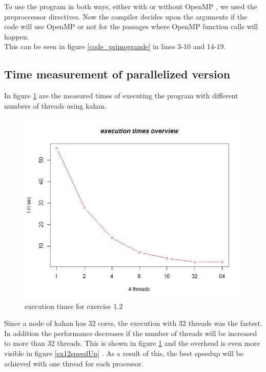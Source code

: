 \documentclass[11pt,a4paper]{article}
\begin{document}
To use the program in both ways, either with or without OpenMP , we used the preproccessor directives. Now the compiler decides upon the arguments if the code will use OpenMP or not for the passages where OpenMP function calls will happen.\\

This can be seen in figure \ref{code_primogrande} in lines 3-10 and 14-19.

\pagebreak
\subsection{Time measurement of parallelized version}

In figure \ref{ex12execution} are the measured times of executing the program with different numbers of threads using kahan.\\

\begin{figure}[h]
\centering
  \includegraphics[scale=0.35]{statistics/Ex12ResultGraph.png}
	\caption{execution times for exercise 1.2}
	\label{ex12execution}
\end{figure}


Since a node of kahan has 32 cores, the execution with 32 threads was the fastest. In addition the performance decreases if the number of threads will be increased to more than 32 threads. This is shown in figure \ref{ex12execution} and the overhead is even more visible in figure \ref{ex12speedUp} .
As a result of this, the best speedup will be achieved with one thread for each processor.
\end{document}
